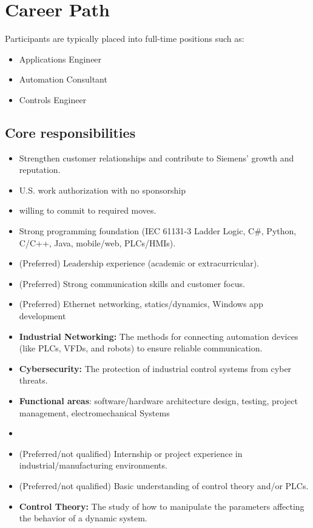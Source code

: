 \documentclass[11pt]{article}
\begin{document}
\section*{Career Path}
Participants are typically placed into full-time positions such as:
\begin{itemize}
  \item Applications Engineer
  \item Automation Consultant
  \item Controls Engineer
\end{itemize}

\newpage
\subsection*{Core responsibilities}
\begin{itemize}
  \item Strengthen customer relationships and contribute to Siemens' growth and reputation.
  \item U.S. work authorization with no sponsorship
  \item willing to commit to required moves.
  \item Strong programming foundation (IEC 61131-3 Ladder Logic, C\#, Python, C/C++, Java, mobile/web, PLCs/HMIs).
  \item (Preferred) Leadership experience (academic or extracurricular).
  \item (Preferred) Strong communication skills and customer focus.
  \item (Preferred) Ethernet networking, statics/dynamics, Windows app development
  \item \textbf{Industrial Networking:} The methods for connecting automation devices (like PLCs, VFDs, and robots) to ensure reliable communication.
  \item \textbf{Cybersecurity:} The protection of industrial control systems from cyber threats.
  \item \textbf{Functional areas}: software/hardware architecture design, testing, project management, electromechanical Systems
  \item \hrulefill
  \item (Preferred/not qualified) Internship or project experience in industrial/manufacturing environments.
  \item (Preferred/not qualified) Basic understanding of control theory and/or PLCs.
  \item \textbf{Control Theory:} The study of how to manipulate the parameters affecting the behavior of a dynamic system.

\end{itemize}
\end{document}
